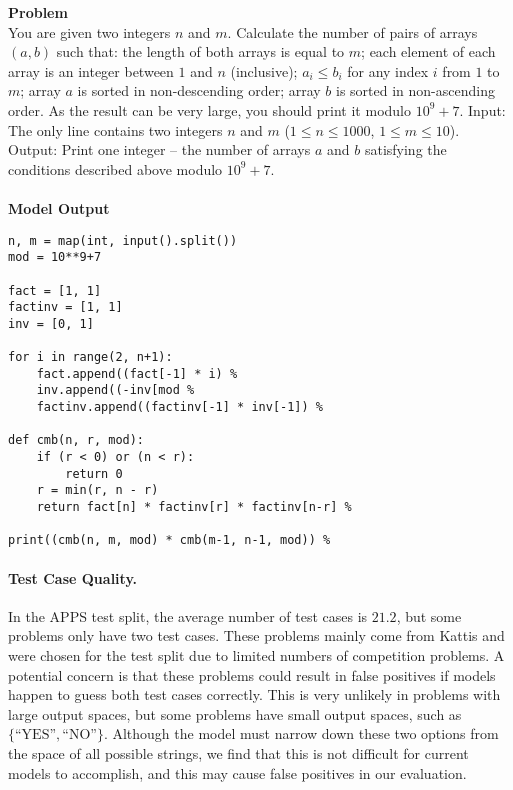 \begin{figure*}
    \textbf{Problem} \\
     You are given two integers $n$ and $m$. Calculate the number of pairs of arrays $(a, b)$ such that:  the length of both arrays is equal to $m$;  each element of each array is an integer between $1$ and $n$ (inclusive);  $a_i \le b_i$ for any index $i$ from $1$ to $m$;  array $a$ is sorted in non-descending order;  array $b$ is sorted in non-ascending order. As the result can be very large, you should print it modulo $10^9+7$. Input: The only line contains two integers $n$ and $m$ ($1 \le n \le 1000$, $1 \le m \le 10$). Output: Print one integer – the number of arrays $a$ and $b$ satisfying the conditions described above modulo $10^9+7$.
 \\
 \\
 \textbf{Model Output}
 \begin{small}
 \begin{verbatim}
n, m = map(int, input().split())
mod = 10**9+7

fact = [1, 1]
factinv = [1, 1]
inv = [0, 1]

for i in range(2, n+1):
    fact.append((fact[-1] * i) %
    inv.append((-inv[mod %
    factinv.append((factinv[-1] * inv[-1]) %

def cmb(n, r, mod):
    if (r < 0) or (n < r):
        return 0
    r = min(r, n - r)
    return fact[n] * factinv[r] * factinv[n-r] %

print((cmb(n, m, mod) * cmb(m-1, n-1, mod)) %
\end{verbatim}
 \end{small}
    \caption{An example from GPT-2 1.5B. Although the code generated passes 0 test cases, it looks plausible at first glance.}
    \label{fig:interesting_sample_from_1500}
\end{figure*}








\paragraph{Test Case Quality.}
In the APPS test split, the average number of test cases is $21.2$, but some problems only have two test cases. These problems mainly come from Kattis and were chosen for the test split due to limited numbers of competition problems. A potential concern is that these problems could result in false positives if models happen to guess both test cases correctly. This is very unlikely in problems with large output spaces, but some problems have small output spaces, such as $\{\text{``YES''}, \text{``NO''}\}$. Although the model must narrow down these two options from the space of all possible strings, we find that this is not difficult for current models to accomplish, and this may cause false positives in our evaluation.

